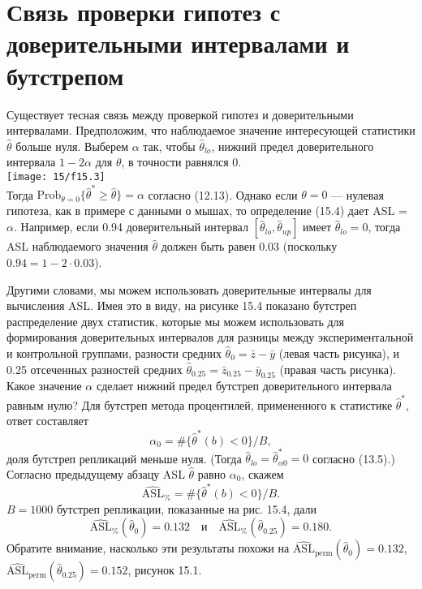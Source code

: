 \section{Связь проверки гипотез с доверительными интервалами и бутстрепом}

Существует тесная связь между проверкой гипотез и доверительными интервалами. Предположим, что наблюдаемое значение интересующей статистики $\hat{\theta}$ больше нуля. Выберем $\alpha$ так, чтобы $\hat{\theta}_{lo}$, нижний предел доверительного интервала $1-2\alpha$ для $\theta$, в точности равнялся 0.\\
\noindent
\texttt{[image: 15/f15.3]}
\newline\\
\noindent Тогда $\text{Prob}_{\theta=0}\{ \hat{\theta}^* \geq \hat{\theta} \} = \alpha$ согласно (12.13). Однако если $\theta = 0$ --- нулевая гипотеза, как в примере с данными о мышах, то определение (15.4) дает ASL = $\alpha$. Например, если 0.94 доверительный интервал $[\hat{\theta}_{lo}, \hat{\theta}_{up}]$ имеет $\hat{\theta}_{lo} = 0$, тогда ASL наблюдаемого значения $\hat{\theta}$ должен быть равен 0.03 (поскольку $0.94 = 1 - 2 \cdot 0.03$).

Другими словами, мы можем использовать доверительные интервалы для вычисления ASL. Имея это в виду, на рисунке 15.4 показано бутстреп распределение двух статистик, которые мы можем использовать для формирования доверительных интервалов для разницы между экспериментальной и контрольной группами, разности средних $\hat{\theta}_0 = \bar{z} - \bar{y}$ (левая часть рисунка), и 0.25 отсеченных разностей средних $\hat{\theta}_{0.25} = \bar{z}_{0.25} - \bar{y}_{0.25}$ (правая часть рисунка). Какое значение $\alpha$ сделает нижний предел бутстреп доверительного интервала равным нулю? Для бутстреп метода процентилей, примененного к статистике $\hat{\theta}^*$, ответ составляет
\begin{equation}
	\alpha_0 = \# \{ \hat{\theta}^*(b) < 0 \}/B,
\end{equation}
доля бутстреп репликаций меньше нуля. (Тогда $\hat{\theta}_{lo} = \hat{\theta}^*_{\alpha 0} = 0$ согласно (13.5).) Согласно предыдущему абзацу ASL $\hat{\theta}$ равно $\alpha_0$, скажем
\begin{equation}
	\widehat{\text{ASL}}_{\%} = \#\{\hat{\theta}^*(b)<0\}/B.
\end{equation}
$B = 1000$ бутстреп репликации, показанные на рис. 15.4, дали
\begin{equation}
	\widehat{\text{ASL}}_{\%}(\hat{\theta}_0) = 0.132 \quad \text{и} \quad \widehat{\text{ASL}}_{\%}(\hat{\theta}_{0.25}) = 0.180.
\end{equation}
Обратите внимание, насколько эти результаты похожи на $\widehat{\text{ASL}}_{\text{perm}} (\hat{\theta}_{0}) = 0.132$, $\widehat{\text{ASL}}_{\text{perm}} (\hat{\theta}_{0.25}) = 0.152$, рисунок 15.1.


